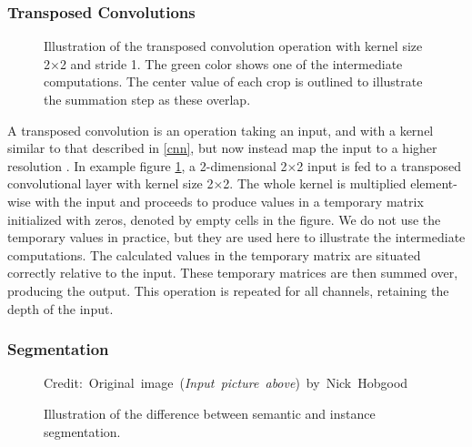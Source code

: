     

\subsubsection{Transposed Convolutions}
    \begin{figure}[H]
        \centering
        
        
        
        \caption[Transposed convolution]{Illustration of the transposed convolution operation with kernel size 2×2 and stride 1. The green color shows one of the intermediate computations. The center value of each crop is outlined to illustrate the summation step as these overlap.}
      	\medskip 
        \label{transposed_conv_fig}
    \end{figure}
    A transposed convolution is an operation taking an input, and with a kernel similar to that described in \ref{cnn}, but now instead map the input to a higher resolution \cite{dumoulin2016guide_transposed_convolution}. In example figure \ref{transposed_conv_fig}, a 2-dimensional 2×2 input is fed to a transposed convolutional layer with kernel size 2×2. The whole kernel is multiplied element-wise with the input and proceeds to produce values in a temporary matrix initialized with zeros, denoted by empty cells in the figure. We do not use the temporary values in practice, but they are used here to illustrate the intermediate computations. The calculated values in the temporary matrix are situated correctly relative to the input. These temporary matrices are then summed over, producing the output. This operation is repeated for all channels, retaining the depth of the input. 
            


\subsubsection{Segmentation}
    \begin{figure}[H]
        \centering
        
        \caption[Difference between semantic and instance segmentation]{Illustration of the difference between semantic and instance segmentation.}
      	\medskip 
        \hspace*{15pt}\hbox{\scriptsize Credit: Original image (\textit{Input picture above}) by Nick Hobgood\cite{clownfish_image}}
        \label{segmentation_fig}
    \end{figure}

